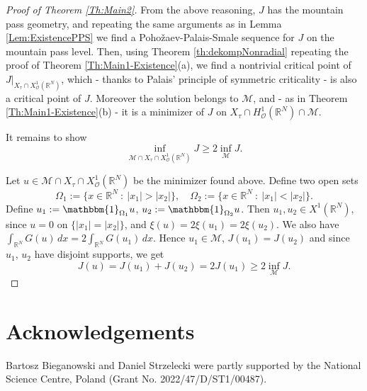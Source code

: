 \documentclass[12pt,leqno,twoside,sort]{amsart}
\newcommand{\R}{\mathbb{R}}
\newcommand{\cM}{{\mathcal M}}
\numberwithin{equation}{section}
\begin{document}
\begin{proof}[Proof of Theorem \ref{Th:Main2}]

From the above reasoning, $J$ has the mountain pass geometry, and repeating the same arguments as in Lemma \ref{Lem:ExistencePPS} we find a Poho\v{z}aev-Palais-Smale sequence for $J$ on the mountain pass level. Then, using Theorem \ref{th:dekompNonradial} repeating the proof of Theorem \ref{Th:Main1-Existence}(a), we find a nontrivial critical point of $J |_{X_\tau \cap X^1_{\mathcal{O}} (\R^N)}$, which - thanks to Palais' principle of symmetric criticality - is also a critical point of $J$. Moreover the solution belongs to $\cM$, and - as in Theorem \ref{Th:Main1-Existence}(b) - it is a minimizer of $J$ on $X_\tau \cap H^1_{\mathcal{O}} (\R^N) \cap \cM$.

It remains to show
$$
\inf_{\cM \cap X_\tau \cap X^1_{\mathcal{O}} (\R^N)} J \geq 2 \inf_\cM J.
$$

Let $u \in \cM \cap X_\tau \cap X^1_{\mathcal{O}} (\R^N)$ be the minimizer found above. Define two open sets
$$
\Omega_1 := \{ x \in \R^N \ : \ |x_1| > |x_2| \}, \quad \Omega_2 := \{ x \in \R^N \ : \ |x_1| < |x_2| \}.
$$
Define $u_1 := \mathbbm{1}_{\Omega_1} u$, $u_2 := \mathbbm{1}_{\Omega_2} u$. Then $u_1, u_2 \in X^1 (\R^N)$, since $u = 0$ on $\{|x_1|=|x_2|\}$, and $\xi(u) = 2 \xi(u_1) = 2 \xi(u_2)$. We also have $\int_{\R^N} G(u) \, dx = 2 \int_{\R^N} G(u_1) \, dx$. Hence $u_1 \in \cM$, $J(u_1) = J(u_2)$ and since $u_1$, $u_2$ have disjoint supports, we get
$$
J(u) = J(u_1) + J(u_2) = 2 J(u_1) \geq 2 \inf_{\cM} J.
$$
\end{proof}


\section*{Acknowledgements}
Bartosz Bieganowski and Daniel Strzelecki were partly supported by the National Science Centre, Poland (Grant No. 2022/47/D/ST1/00487).


\end{document}
